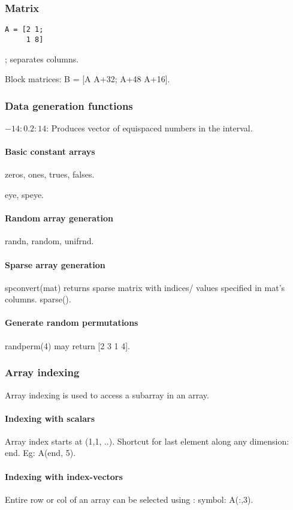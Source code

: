 \documentclass[oneside, article]{memoir}
\begin{document}
\subsubsection{Matrix}
\begin{verbatim}
A = [2 1;
     1 8]
\end{verbatim}
; separates columns.

Block matrices: B = [A  A+32; A+48  A+16].

\subsubsection{Data generation functions}
$-14:0.2:14$: Produces vector of equispaced numbers in the interval.

\paragraph*{Basic constant arrays}
zeros, ones, trues, falses.

eye, speye.

\paragraph*{Random array generation}
randn, random, unifrnd.

\paragraph*{Sparse array generation}
spconvert(mat) returns sparse matrix with indices/ values specified in mat's columns. sparse().

\paragraph*{Generate random permutations}
randperm(4) may return [2 3 1 4].

\subsubsection{Array indexing}
Array indexing is used to access a subarray in an array.

\paragraph*{Indexing with scalars}
Array index starts at (1,1, ..). Shortcut for last element along any dimension: end. Eg: A(end, 5).

\paragraph*{Indexing with index-vectors}
Entire row or col of an array can be selected using : symbol: A(:,3).
\end{document}
